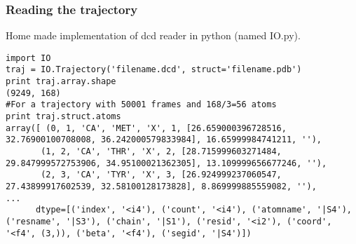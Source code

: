 \begin{frame}[fragile]
    \frametitle{Reading the trajectory}
    Home made implementation of dcd reader in python (named IO.py).
    \begin{lstlisting}
import IO
traj = IO.Trajectory('filename.dcd', struct='filename.pdb')
print traj.array.shape
(9249, 168)
#For a trajectory with 50001 frames and 168/3=56 atoms
print traj.struct.atoms
array([ (0, 1, 'CA', 'MET', 'X', 1, [26.659000396728516, 32.76900100708008, 36.242000579833984], 16.65999984741211, ''),
       (1, 2, 'CA', 'THR', 'X', 2, [28.715999603271484, 29.847999572753906, 34.95100021362305], 13.109999656677246, ''),
       (2, 3, 'CA', 'TYR', 'X', 3, [26.924999237060547, 27.43899917602539, 32.58100128173828], 8.869999885559082, ''),
...
      dtype=[('index', '<i4'), ('count', '<i4'), ('atomname', '|S4'), ('resname', '|S3'), ('chain', '|S1'), ('resid', '<i2'), ('coord', '<f4', (3,)), ('beta', '<f4'), ('segid', '|S4')])
    \end{lstlisting}
\end{frame}
